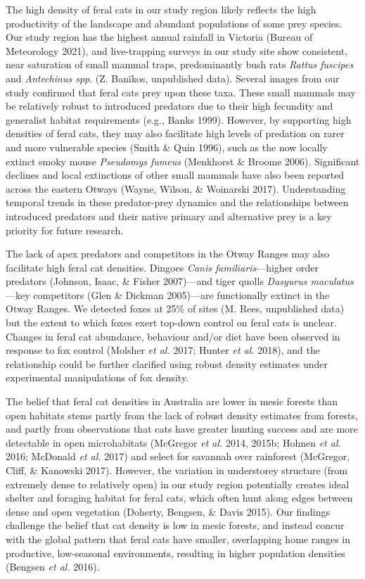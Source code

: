 \documentclass[11pt,a4paper,titlepage,twoside,openright]{style/unimelbthesis}
\begin{document}
\begin{mainmatter}
The high density of feral cats in our study region likely reflects the high productivity of the landscape and abundant populations of some prey species. Our study region has the highest annual rainfall in Victoria (Bureau of Meteorology 2021), and live-trapping surveys in our study site show consistent, near saturation of small mammal traps, predominantly bush rats \emph{Rattus fuscipes} and \emph{Antechinus spp}. (Z. Banïkos, unpublished data). Several images from our study confirmed that feral cats prey upon these taxa. These small mammals may be relatively robust to introduced predators due to their high fecundity and generalist habitat requirements (e.g., Banks 1999). However, by supporting high densities of feral cats, they may also facilitate high levels of predation on rarer and more vulnerable species (Smith \& Quin 1996), such as the now locally extinct smoky mouse \emph{Pseudomys fumeus} (Menkhorst \& Broome 2006). Significant declines and local extinctions of other small mammals have also been reported across the eastern Otways (Wayne, Wilson, \& Woinarski 2017). Understanding temporal trends in these predator-prey dynamics and the relationships between introduced predators and their native primary and alternative prey is a key priority for future research.

The lack of apex predators and competitors in the Otway Ranges may also facilitate high feral cat densities. Dingoes \emph{Canis familiaris}---higher order predators (Johnson, Isaac, \& Fisher 2007)---and tiger quolls \emph{Dasyurus maculatus}---key competitors (Glen \& Dickman 2005)---are functionally extinct in the Otway Ranges. We detected foxes at 25\% of sites (M. Rees, unpublished data) but the extent to which foxes exert top-down control on feral cats is unclear. Changes in feral cat abundance, behaviour and/or diet have been observed in response to fox control (Molsher \emph{et al.} 2017; Hunter \emph{et al.} 2018), and the relationship could be further clarified using robust density estimates under experimental manipulations of fox density.

The belief that feral cat densities in Australia are lower in mesic forests than open habitats stems partly from the lack of robust density estimates from forests, and partly from observations that cats have greater hunting success and are more detectable in open microhabitats (McGregor \emph{et al.} 2014, 2015b; Hohnen \emph{et al.} 2016; McDonald \emph{et al.} 2017) and select for savannah over rainforest (McGregor, Cliff, \& Kanowski 2017). However, the variation in understorey structure (from extremely dense to relatively open) in our study region potentially creates ideal shelter and foraging habitat for feral cats, which often hunt along edges between dense and open vegetation (Doherty, Bengsen, \& Davis 2015). Our findings challenge the belief that cat density is low in mesic forests, and instead concur with the global pattern that feral cats have smaller, overlapping home ranges in productive, low-seasonal environments, resulting in higher population densities (Bengsen \emph{et al.} 2016).


\end{mainmatter}
\end{document}
